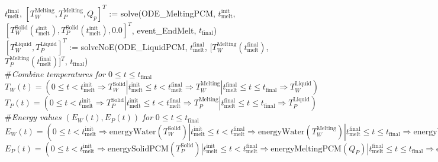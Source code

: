 \documentclass[12pt, titlepage]{article}
\begin{document}
\noindent $t_\text{melt}^\text{final}$, $[T_W^{\text{Melting}},
T_P^{\text{Melting}}, Q_p]^T$ := solve(ODE\_MeltingPCM,
$t_\text{melt}^\text{init}$, $[T_W^{\text{Solid}}(t_\text{melt}^\text{init}),
  T_P^{\text{Solid}}(t_\text{melt}^\text{init}), 0.0]^T$,
  event\_EndMelt, $t_\text{final}$)\\

\noindent $[ T_W^{\text{Liquid}}, T_P^{\text{Liquid}}]^T$ := solveNoE(ODE\_LiquidPCM, $t_\text{melt}^\text{final}$,
[$T_W^{\text{Melting}}(t_\text{melt}^\text{final})$,
$T_P^{\text{Melting}}(t_\text{melt}^\text{final})$]$^T$, $t_\text{final}$)\\

\noindent \#\textit{Combine temperatures for $0 \leq t \leq t_\text{final}$}\\

\noindent $T_W(t) = (0 \leq t < t_\text{melt}^{\text{init}} \Rightarrow
T_W^{\text{Solid}} | t_\text{melt}^{\text{init}} \leq t <
t_\text{melt}^{\text{final}} \Rightarrow T_W^{\text{Melting}} |
t_\text{melt}^{\text{final}} \leq t \leq
t_\text{final} \Rightarrow T_W^{\text{Liquid}} )$\\

\noindent $T_P(t) = (0 \leq t < t_\text{melt}^{\text{init}} \Rightarrow
T_P^{\text{Solid}} | t_\text{melt}^{\text{init}} \leq t <
t_\text{melt}^{\text{final}} \Rightarrow T_P^{\text{Melting}} | t_\text{melt}^{\text{final}} \leq t \leq
t_\text{final} \Rightarrow T_P^{\text{Liquid}} )$\\

\noindent \#\textit{Energy values} $(E_W(t), E_P(t))$ \textit{for} $0 \leq t \leq t_\text{final}$\\

\noindent $E_W(t) = (0 \leq t < t_\text{melt}^{\text{init}} \Rightarrow
\text{energyWater}(T_W^{\text{Solid}}) | t_\text{melt}^{\text{init}} \leq t <
t_\text{melt}^{\text{final}} \Rightarrow \text{energyWater}(T_W^{\text{Melting}}) | t_\text{melt}^{\text{final}} \leq t \leq
t_\text{final} \Rightarrow \text{energyWater}(T_W^{\text{Liquid}}) )$\\

\noindent $E_P(t) = (0 \leq t < t_\text{melt}^{\text{init}} \Rightarrow
\text{energySolidPCM}(T_P^{\text{Solid}}) | t_\text{melt}^{\text{init}} \leq t <
t_\text{melt}^{\text{final}} \Rightarrow \text{energyMeltingPCM}(Q_P) | t_\text{melt}^{\text{final}} \leq t \leq
t_\text{final} \Rightarrow \text{energyLiquidPCM}(T_P^{\text{Liquid}}) )$\\
\end{document}
